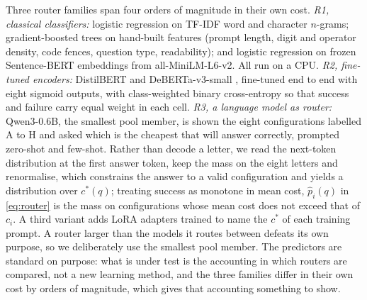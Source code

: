 \documentclass[final,5p,times,twocolumn]{elsarticle}
\theoremstyle{plain}
\newcommand{\cstar}{c^{*}}
\begin{document}
Three router families span four orders of magnitude in their own cost.
\emph{R1, classical classifiers:} logistic regression on TF-IDF word and
character $n$-grams; gradient-boosted trees
\cite{chen2016xgboost,ke2017lightgbm} on hand-built features (prompt length,
digit and operator density, code fences, question type, readability); and
logistic regression on frozen Sentence-BERT embeddings
\cite{reimers2019sbert} from all-MiniLM-L6-v2. All run
on a CPU. \emph{R2, fine-tuned encoders:} DistilBERT \cite{sanh2019distilbert}
and DeBERTa-v3-small \cite{he2023debertav3}, fine-tuned end to
end with eight sigmoid outputs, with class-weighted binary cross-entropy so
that success and failure carry equal weight in each cell. \emph{R3, a
language model as router:} Qwen3-0.6B, the smallest pool member, is shown the
eight configurations labelled A to H and asked which is the cheapest that
will answer correctly, prompted zero-shot and few-shot. Rather than decode a
letter, we read the next-token distribution at the first answer token, keep
the mass on the eight letters and renormalise, which constrains the answer to
a valid configuration and yields a distribution over $\cstar(q)$; treating
success as monotone in mean cost, $\hat{p}_i(q)$ in \eqref{eq:router} is the
mass on configurations whose mean cost does not exceed that of $c_i$. A third
variant adds LoRA adapters \cite{hu2022lora} trained to name the $\cstar$ of
each training prompt. A router larger than the models it routes between
defeats its own purpose, so we deliberately use the smallest pool member. The
predictors are standard on purpose: what is under test is the accounting in
which routers are compared, not a new learning method, and the three families
differ in their own cost by orders of magnitude, which gives that accounting
something to show.
\end{document}
